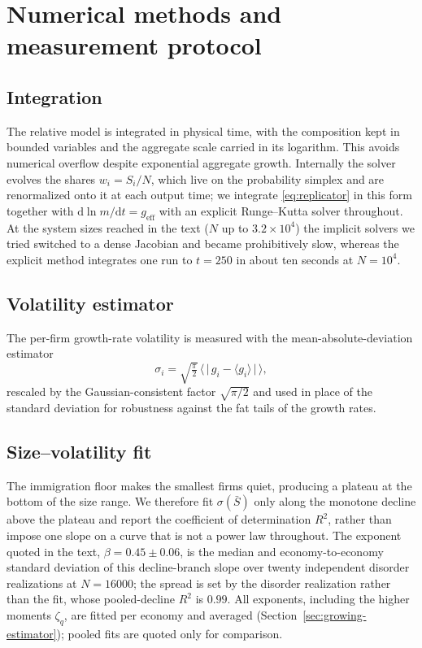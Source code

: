 \chapter{Numerical methods and measurement protocol}
\label{app:numerics}

\section{Integration}

The relative model is integrated in physical time, with the composition kept in bounded
variables and the aggregate scale carried in its logarithm. This avoids numerical overflow despite
exponential aggregate growth. Internally the solver evolves the shares
$w_i = S_i/N$, which live on the probability simplex and are renormalized onto it at
each output time; we integrate \eqref{eq:replicator} in this form
together with $\mathrm{d}\ln m/\mathrm{d}t = g_{\mathrm{eff}}$ with an explicit
Runge--Kutta solver throughout. At the system sizes reached in the text ($N$ up to
$3.2\times10^4$) the implicit solvers we tried switched to a dense Jacobian and became
prohibitively slow, whereas the explicit method integrates one run to $t = 250$ in about
ten seconds at $N = 10^4$.

\section{Volatility estimator}

The per-firm growth-rate volatility is measured with the mean-absolute-deviation
estimator
\begin{equation}
    \sigma_i = \sqrt{\tfrac{\pi}{2}}\,\big\langle\, \big|\,g_i - \langle g_i\rangle\,\big| \,\big\rangle ,
\end{equation}
rescaled by the Gaussian-consistent factor $\sqrt{\pi/2}$ and used in place of the
standard deviation for robustness against the fat tails of the growth rates.

\section{Size--volatility fit}

The immigration floor makes the smallest firms quiet, producing a plateau at the bottom
of the size range. We therefore fit $\sigma(\bar S)$ only along the monotone decline above the
plateau and report the coefficient of determination $R^2$, rather than impose one slope on a
curve that is not a power law throughout. The exponent quoted in the text, $\beta = 0.45 \pm 0.06$, is
the median and economy-to-economy standard deviation of this decline-branch slope over
twenty independent disorder realizations at $N = 16000$; the spread is set by the disorder
realization rather than the fit, whose pooled-decline $R^2$ is $0.99$. All exponents,
including the higher moments $\zeta_q$, are fitted per economy and averaged
(Section~\ref{sec:growing-estimator}); pooled fits are quoted only for comparison.


